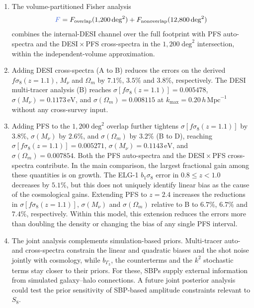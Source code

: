 \documentclass[a4paper,11pt]{article}
\newcommand{\revchange}[1]{{\color{RevisionColor}#1}}
\newcommand{\Om}{\Omega_m}
\def\iMpch{\,h\,\mathrm{Mpc}^{-1}}
\def\kmax{k_{\mathrm{max}}}
\newcommand{\se}{\ensuremath{\sigma_{8}}\xspace}
\newcommand{\Mnu}{M_\nu}
\begin{document}
\begin{enumerate}
\item \revchange{The volume-partitioned Fisher analysis}
  \[\revchange{F}=F_{\mathrm{overlap}}(1{,}200\,\mathrm{deg}^2)
   + F_{\mathrm{nonoverlap}}(12{,}800\,\mathrm{deg}^2)\]
  combines the internal-DESI channel over the full footprint with
  \revchange{PFS auto-spectra and the DESI\,$\times$\,PFS cross-spectra} in the
  $1{,}200\;\mathrm{deg}^2$ intersection, \revchange{within the independent-volume
  approximation.}



\item \revchange{Adding DESI cross-spectra (A to B) reduces the errors on the derived $f\se(z=1.1)$,
  $\Mnu$ and $\Om$ by $7.1\%$, $3.5\%$ and
  $3.8\%$, respectively. The DESI multi-tracer analysis (B) reaches
  $\sigma[f\se(z=1.1)]=0.005478$,
  $\sigma(\Mnu)=0.1173\,\mathrm{eV}$, and
  $\sigma(\Om)=0.008115$} at $\kmax=0.20\iMpch$ without any
  cross-survey input.

\item Adding PFS to the $1{,}200\;\mathrm{deg}^2$ overlap further
  tightens \revchange{$\sigma[f\se(z=1.1)]$ by $3.8\%$,
  $\sigma(\Mnu)$ by $2.6\%$, and $\sigma(\Om)$ by
  $3.2\%$ (B to D), reaching
  $\sigma[f\se(z=1.1)]=0.005271$,
  $\sigma(\Mnu)=0.1143\,\mathrm{eV}$, and
  $\sigma(\Om)=0.007854$. Both the PFS auto-spectra and the DESI\,$\times$\,PFS cross-spectra contribute. In the main comparison, the largest fractional gain among these
  quantities is on growth. The ELG-1 $b_1\se$ error in
  $0.8\leq z<1.0$ decreases by $5.1\%$, but this does not
  uniquely identify linear bias as the cause of the cosmological
  gains. Extending PFS to $z=2.4$ increases the reductions in
  $\sigma[f\se(z=1.1)]$, $\sigma(\Mnu)$ and $\sigma(\Om)$ relative to B to
  $6.7\%$, $6.7\%$ and $7.4\%$, respectively. Within this model, this
  extension reduces the errors more than doubling the density or changing
  the bias of any single PFS interval.}

\item \revchange{The joint analysis complements simulation-based priors.
  Multi-tracer auto- and cross-spectra constrain the linear and quadratic
  biases and the shot noise jointly with cosmology, while $b_{\Gamma_3}$, the
  counterterms and the $k^2$ stochastic terms stay closer to their priors.
  For these, SBPs supply external information from simulated galaxy--halo
  connections. A future joint posterior analysis could test the prior sensitivity of
  SBP-based amplitude constraints relevant to $S_8$.}


\end{enumerate}
\end{document}

